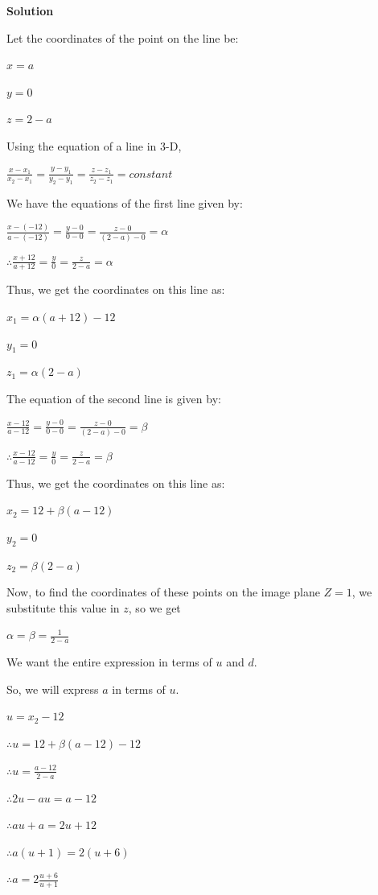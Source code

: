 \documentclass{assignment}
\begin{document}
\begin{problemlist}
\begin{legal}
\textbf{Solution}

Let the coordinates of the point on the line be:

$x = a$

$y = 0$

$z = 2 - a$

Using the equation of a line in 3-D,

$\frac{x - x_1}{x_2 - x_1} = \frac{y - y_1}{y_2 - y_1} = \frac{z - z_1}{z_2 - z_1} = constant$

We have the equations of the first line given by:

$\frac{x - (-12)}{a - (-12)} = \frac{y - 0}{0 - 0} = \frac{z - 0}{(2 - a) - 0} = \alpha$

$\therefore \frac{x + 12}{a + 12} = \frac{y}{0} = \frac{z}{2 - a} = \alpha$

Thus, we get the coordinates on this line as:

$x_1 = \alpha(a + 12) - 12$

$y_1 = 0$

$z_1 = \alpha(2 - a)$

The equation of the second line is given by:

$\frac{x - 12}{a - 12} = \frac{y - 0}{0 - 0} = \frac{z - 0}{(2 - a) - 0} = \beta$

$\therefore \frac{x - 12}{a - 12} = \frac{y}{0} = \frac{z}{2 - a} = \beta$

Thus, we get the coordinates on this line as:

$x_2 = 12 + \beta(a - 12)$ 

$y_2 = 0$

$z_2 = \beta(2 - a)$

Now, to find the coordinates of these points on the image plane $Z = 1$, we substitute this value in $z$, so we get

$\alpha = \beta = \frac{1}{2 - a}$

We want the entire expression in terms of $u$ and $d$.

So, we will express $a$ in terms of $u$.

$u = x_2 - 12$

$\therefore u = 12 + \beta(a - 12) - 12$

$\therefore u = \frac{a - 12}{2 - a}$

$\therefore 2u - au = a - 12$

$\therefore au + a = 2u + 12$

$\therefore a(u + 1) = 2(u + 6)$

$\therefore a = 2\frac{u + 6}{u + 1}$


\end{legal}
\end{problemlist}
\end{document}
